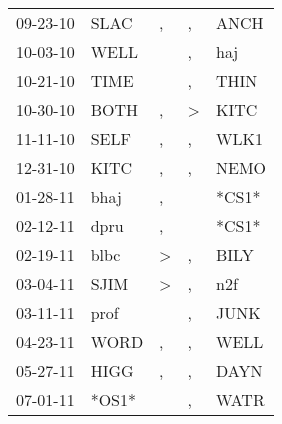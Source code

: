 \begin{supertabular}{p{0.07\textwidth}p{0.06\textwidth}p{0.02\textwidth}p{0.02\textwidth}p{0.06\textwidth}}
          09-23-10\textsuperscript{} &           SLAC\textsuperscript{} &                , &                , &           ANCH\textsuperscript{} \\
          10-03-10\textsuperscript{} &           WELL\textsuperscript{} &                  &                , &            haj\textsuperscript{} \\
          10-21-10\textsuperscript{} &           TIME\textsuperscript{} &                  &                , &           THIN\textsuperscript{} \\
          10-30-10\textsuperscript{} &           BOTH\textsuperscript{} &                , &     \textgreater &           KITC\textsuperscript{} \\
          11-11-10\textsuperscript{} &           SELF\textsuperscript{} &                , &                , &           WLK1\textsuperscript{} \\
          12-31-10\textsuperscript{} &           KITC\textsuperscript{} &                , &                , &           NEMO\textsuperscript{} \\
          01-28-11\textsuperscript{} &           bhaj\textsuperscript{} &                , &                  &                            *CS1* \\
          02-12-11\textsuperscript{} &           dpru\textsuperscript{} &                , &                  &                            *CS1* \\
          02-19-11\textsuperscript{} &           blbc\textsuperscript{} &     \textgreater &                , &           BILY\textsuperscript{} \\
          03-04-11\textsuperscript{} &           SJIM\textsuperscript{} &     \textgreater &                , &            n2f\textsuperscript{} \\
          03-11-11\textsuperscript{} &           prof\textsuperscript{} &                  &                , &           JUNK\textsuperscript{} \\
          04-23-11\textsuperscript{} &           WORD\textsuperscript{} &                , &                , &           WELL\textsuperscript{} \\
          05-27-11\textsuperscript{} &           HIGG\textsuperscript{} &                , &                , &           DAYN\textsuperscript{} \\
          07-01-11\textsuperscript{} &                            *OS1* &                  &                , &           WATR\textsuperscript{} \\

\end{supertabular}
